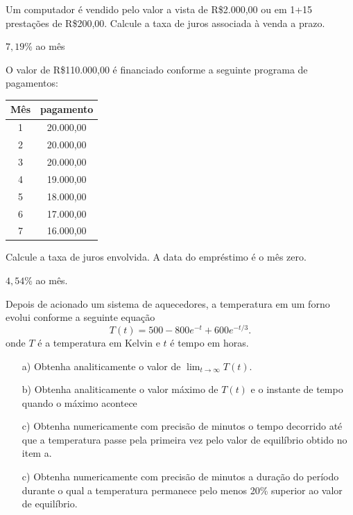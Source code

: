 \begin{Exercise}[title= Matemática financeira] Um computador é vendido pelo valor a vista de R\$2.000,00 ou em 1+15 prestações de R\$200,00. Calcule a taxa de juros associada à venda a prazo.
\end{Exercise}

\begin{Answer}
  \begin{tiny}
$7,19$\% ao mês    
  \end{tiny}
\end{Answer}

\begin{Exercise}[title= Matemática financeira] O valor de R\$110.000,00 é financiado conforme a seguinte programa de pagamentos:

\begin{tabular}{|c|c|}
\hline
Mês & pagamento\\
\hline
1&20.000,00\\
2&20.000,00\\
3&20.000,00\\
4&19.000,00\\
5&18.000,00\\
6&17.000,00\\
7&16.000,00\\
\hline	
\end{tabular}

Calcule a taxa de juros envolvida. A data do empréstimo é o mês zero.
 \end{Exercise}

\begin{Answer}
  \begin{tiny}
$4,54$\% ao mês.    
  \end{tiny}
\end{Answer}


\begin{Exercise}[title=Controle de sistemas]  Depois de acionado um sistema de aquecedores, a temperatura em um forno  evolui conforme a seguinte equação
$$T(t)=500-800e^{-t}+600e^ {-t/3}.$$
onde $T$ é a temperatura em Kelvin e $t$ é tempo em horas.
\begin{itemize}
\item[a)] Obtenha analiticamente o valor de $\lim_{t\to\infty}T(t)$.
\item[b)] Obtenha analiticamente o valor máximo de $T(t)$ e o instante de tempo quando o máximo acontece
\item[c)] Obtenha numericamente com precisão de minutos o tempo decorrido até que a temperatura passe pela primeira vez pelo valor de equilíbrio obtido no item a.
\item[c)] Obtenha numericamente com precisão de minutos a duração do período durante o qual a temperatura permanece pelo menos 20\% superior ao valor de equilíbrio.
\end{itemize}
\end{Exercise}

